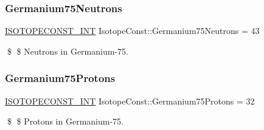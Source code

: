 \subsubsection{\texorpdfstring{Germanium75\+Neutrons}{Germanium75Neutrons}}
{\footnotesize\ttfamily \mbox{\hyperlink{group___isotope_const-_macros_ga5f18360b3e99483a35c32d789e62621c}{I\+S\+O\+T\+O\+P\+E\+C\+O\+N\+S\+T\+\_\+\+I\+NT}} Isotope\+Const\+::\+Germanium75\+Neutrons = 43}

\$ \$ Neutrons in Germanium-\/75. \mbox{\label{group___isotope_const-_germanium-_ge75_gadbcc64e194c3afc1a687fac9cc98e4b8}} 
\subsubsection{\texorpdfstring{Germanium75\+Protons}{Germanium75Protons}}
{\footnotesize\ttfamily \mbox{\hyperlink{group___isotope_const-_macros_ga5f18360b3e99483a35c32d789e62621c}{I\+S\+O\+T\+O\+P\+E\+C\+O\+N\+S\+T\+\_\+\+I\+NT}} Isotope\+Const\+::\+Germanium75\+Protons = 32}

\$ \$ Protons in Germanium-\/75. 